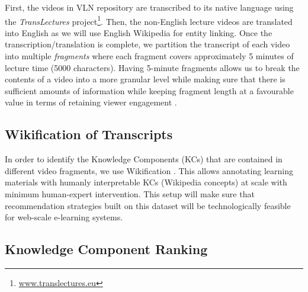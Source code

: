 \documentclass[letterpaper]{article} %
\begin{document}
First, the videos in VLN repository are transcribed to its native language using the \emph{TransLectures} project\footnote{\url{www.translectures.eu}}. Then, the non-English lecture videos are translated into English as we will use English Wikipedia for entity linking.
Once the transcription/translation is complete, we partition the transcript of each video into multiple \emph{fragments} where each fragment covers approximately 5 minutes of lecture time (5000 characters).
Having 5-minute fragments allows us to break the contents of a video into a more granular level while making sure that there is sufficient amounts of information while keeping fragment length at a favourable value in terms of retaining viewer engagement \cite{Guo_vid_prod}.

\subsection{Wikification of Transcripts}
In order to identify the Knowledge Components (KCs) that are contained in different video fragments, we use Wikification \cite{wikifier}. This allows annotating learning materials with humanly interpretable KCs (Wikipedia concepts) at scale with minimum human-expert intervention. This setup will make sure that recommendation strategies built on this dataset will be technologically feasible for web-scale e-learning systems.


\subsection{Knowledge Component Ranking}
\end{document}
